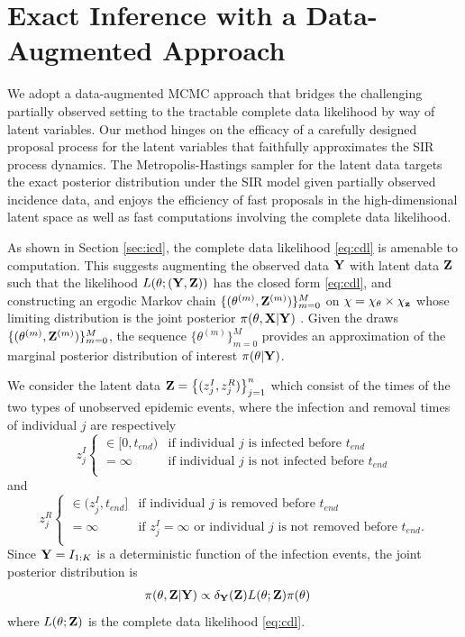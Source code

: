 \documentclass[11pt]{article}
\begin{document}
	\section{Exact Inference with a  Data-Augmented Approach}
	\label{sec:con}
	
	We adopt a data-augmented MCMC approach that bridges the challenging partially observed setting to the tractable complete data likelihood by way of latent variables. Our method hinges on the efficacy of a carefully designed proposal process for the latent variables that faithfully approximates the SIR process dynamics.
	The Metropolis-Hastings sampler for the latent data targets the exact posterior distribution under the SIR model given partially observed incidence data, and enjoys the efficiency of fast proposals in the high-dimensional latent space as well as fast computations involving the complete data likelihood.
	
	As shown in Section \eqref{sec:icd}, the complete data likelihood \eqref{eq:cdl} is amenable to computation. This suggests augmenting the observed data $\mathbf{Y}$ with latent data $\mathbf{Z}$ such that the likelihood $L(\theta; (\mathbf{Y}, \mathbf{Z}))$ has the closed form \eqref{eq:cdl}, and constructing an ergodic Markov chain $\{(\theta^{(m)}, \mathbf{Z}^{(m)})\}_{m=0}^M$ on $\chi = \chi_{\theta} \times \chi_{\mathbf{z}}$ whose limiting distribution is the joint posterior $\pi(\theta, \mathbf{X}|\mathbf{Y})$ \cite{Gibson.1998, ONeill.1999, Fintzi.2017}. Given the draws $\{(\theta^{(m)}, \mathbf{Z}^{(m)})\}_{m=0}^M$, the sequence $\{\theta^{(m)}\}_{m=0}^M$ provides an approximation of the marginal posterior distribution of interest $\pi(\theta|\mathbf{Y})$.
	
	We consider the latent data $\mathbf{Z} = \left\lbrace (z^I_j, z^R_j)\right\rbrace_{j=1}^{n}$ which consist of the times of the two types of unobserved epidemic events, where the infection and removal times of individual $j$ are respectively
	$$z^I_j \begin{cases}
		\in [0, t_{end}) & \text{if individual } j \text{ is infected before } t_{end} \\
		= \infty & \text{if individual } j \text{ is not infected before } t_{end} \\
	\end{cases}$$
	and
	$$z^R_j \begin{cases}
		\in (z^I_j, t_{end}] & \text{if individual } j \text{ is removed before } t_{end} \\
		= \infty & \text{if } z^I_j = \infty \text{ or individual } j \text{ is not removed before } t_{end}. \\
	\end{cases}$$
	Since $\mathbf{Y} = I_{1:K}$ is a deterministic function of the infection events, the joint posterior distribution is
	\begin{align*}
	    \pi(\theta, \mathbf{Z}|\mathbf{Y})
	    & \propto \delta_{\mathbf{Y}}(\mathbf{Z}) L(\theta; \mathbf{Z}) \pi(\theta)
	\end{align*}
	where $L(\theta; \mathbf{Z})$ is the complete data likelihood \eqref{eq:cdl}.
	
\end{document}
